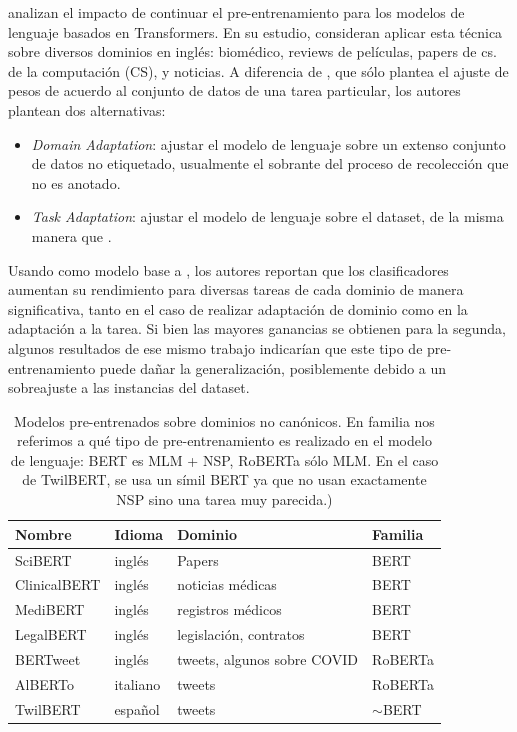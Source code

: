 \citet{gururangan-etal-2020-dont} analizan el impacto de continuar el pre-entrenamiento para los modelos de lenguaje basados en Transformers. En su estudio, consideran aplicar esta técnica sobre diversos dominios en inglés: biomédico, reviews de películas, papers de cs. de la computación (CS), y noticias. A diferencia de \ulmfit{}, que sólo plantea el ajuste de pesos de acuerdo al conjunto de datos de una tarea particular, los autores plantean dos alternativas:

\begin{itemize}
    \item \emph{Domain Adaptation}: ajustar el modelo de lenguaje sobre un extenso conjunto de datos no etiquetado, usualmente el sobrante del proceso de recolección que no es anotado.
    \item \emph{Task Adaptation}: ajustar el modelo de lenguaje sobre el dataset, de la misma manera que \citet{howard-ruder-2018-universal}.
\end{itemize}

Usando como modelo base a \roberta{}, los autores reportan que los clasificadores aumentan su rendimiento para diversas tareas de cada dominio de manera significativa, tanto en el caso de realizar adaptación de dominio como en la adaptación a la tarea. Si bien las mayores ganancias se obtienen para la segunda, algunos resultados de ese mismo trabajo indicarían que este tipo de pre-entrenamiento puede dañar la generalización, posiblemente debido a un sobreajuste a las instancias del dataset.

\begin{table}
    \centering
    \begin{tabular}{llll}
        Nombre       & Idioma   & Dominio                     & Familia    \\
        \hline
        SciBERT      & inglés   & Papers                      & BERT       \\
        ClinicalBERT & inglés   & noticias médicas            & BERT       \\
        MediBERT     & inglés   & registros médicos           & BERT       \\
        LegalBERT    & inglés   & legislación, contratos      & BERT       \\
        BERTweet     & inglés   & tweets, algunos sobre COVID & RoBERTa    \\
        AlBERTo      & italiano & tweets                      & RoBERTa    \\
        TwilBERT     & español  & tweets                      & $\sim$BERT \\
        \hline
    \end{tabular}

    \caption{Modelos pre-entrenados sobre dominios no canónicos. En familia nos referimos a qué tipo de pre-entrenamiento es realizado en el modelo de lenguaje: BERT es MLM + NSP, RoBERTa sólo MLM. En el caso de TwilBERT, se usa un símil BERT ya que no usan exactamente NSP sino una tarea muy parecida.)}
    \label{tab:bert_pretrained_models}
\end{table}


